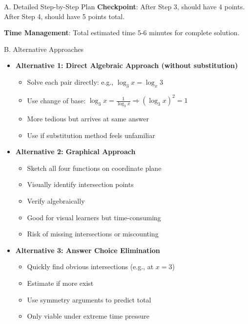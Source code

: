 \documentclass[12pt]{article}
\begin{document}
\begin{roadmapbox}{A. Detailed Step-by-Step Plan}
\textbf{Checkpoint}: After Step 3, should have 4 points. After Step 4, should have 5 points total.

\textbf{Time Management}: Total estimated time 5-6 minutes for complete solution.
\end{roadmapbox}

\begin{roadmapbox}{B. Alternative Approaches}
\begin{itemize}[leftmargin=*]
    \item \textbf{Alternative 1: Direct Algebraic Approach (without substitution)}
    \begin{itemize}
        \item Solve each pair directly: e.g., $\log_3 x = \log_x 3$
        \item Use change of base: $\log_3 x = \frac{1}{\log_3 x} \Rightarrow (\log_3 x)^2 = 1$
        \item More tedious but arrives at same answer
        \item Use if substitution method feels unfamiliar
    \end{itemize}
    
    \item \textbf{Alternative 2: Graphical Approach}
    \begin{itemize}
        \item Sketch all four functions on coordinate plane
        \item Visually identify intersection points
        \item Verify algebraically
        \item Good for visual learners but time-consuming
        \item Risk of missing intersections or miscounting
    \end{itemize}
    
    \item \textbf{Alternative 3: Answer Choice Elimination}
    \begin{itemize}
        \item Quickly find obvious intersections (e.g., at $x = 3$)
        \item Estimate if more exist
        \item Use symmetry arguments to predict total
        \item Only viable under extreme time pressure
    \end{itemize}
\end{itemize}
\end{roadmapbox}
\end{document}
